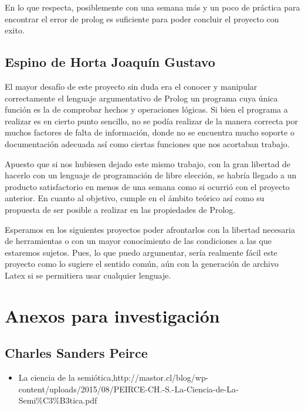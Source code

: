 En lo que respecta, posiblemente con una semana más y un poco de
práctica para encontrar el error de prolog es suficiente para poder
concluir el proyecto con exito.

\hypertarget{espino-de-horta-joaquuxedn-gustavo}{%
\subsection{Espino de Horta Joaquín
Gustavo}\label{espino-de-horta-joaquuxedn-gustavo}}

El mayor desafío de este proyecto sin duda era el conocer y manipular
correctamente el lenguaje argumentativo de Prolog un programa cuya única
función es la de comprobar hechos y operaciones lógicas. Si bien el
programa a realizar es en cierto punto sencillo, no se podía realizar de
la manera correcta por muchos factores de falta de información, donde no
se encuentra mucho soporte o documentación adecuada así como ciertas
funciones que nos acortaban trabajo.

Apuesto que si nos hubiesen dejado este mismo trabajo, con la gran
libertad de hacerlo con un lenguaje de programación de libre elección,
se habría llegado a un producto satisfactorio en menos de una semana
como si ocurrió con el proyecto anterior. En cuanto al objetivo, cumple
en el ámbito teórico así como su propuesta de ser posible a realizar en
las propiedades de Prolog.

Esperamos en los siguientes proyectos poder afrontarlos con la libertad
necesaria de herramientas o con un mayor conocimiento de las condiciones
a las que estaremos sujetos. Pues, lo que puedo argumentar, sería
realmente fácil este proyecto como lo sugiere el sentido común, aún con
la generación de archivo Latex si se permitiera usar cualquier lenguaje.

\hypertarget{anexos-para-investigaciuxf3n}{%
\section{Anexos para investigación}\label{anexos-para-investigaciuxf3n}}

\hypertarget{charles-sanders-peirce}{%
\subsection{Charles Sanders Peirce}\label{charles-sanders-peirce}}

\begin{itemize}
\tightlist
\item
  La ciencia de la
  semiótica,http://mastor.cl/blog/wp-content/uploads/2015/08/PEIRCE-CH.-S.-La-Ciencia-de-La-Semi\%C3\%B3tica.pdf
\end{itemize}


